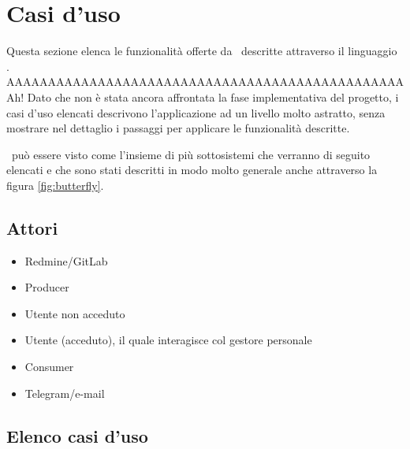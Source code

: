 \section{Casi d'uso}
Questa sezione elenca le funzionalità offerte da \progetto\ descritte attraverso il linguaggio . 
AAAAAAAAAAAAAAAAAAAAAAAAAAAAAAAAAAAAAAAAAAAAAAAAAh!
Dato che non è stata ancora affrontata la fase implementativa del progetto, i casi d'uso elencati descrivono l'applicazione ad un livello molto astratto, senza mostrare nel dettaglio i passaggi per applicare le funzionalità descritte.

\progetto\ può essere visto come l'insieme di più sottosistemi che verranno di seguito elencati e che sono stati descritti in modo molto generale anche attraverso la figura \ref{fig:butterfly}.
	
	\subsection{Attori}
	\begin{itemize}
		\item Redmine/GitLab
		\item Producer
		\item Utente non acceduto
		\item Utente (acceduto), il quale interagisce col gestore personale
		\item Consumer
		\item Telegram/e-mail
	\end{itemize}
	
	\subsection{Elenco casi d'uso}



